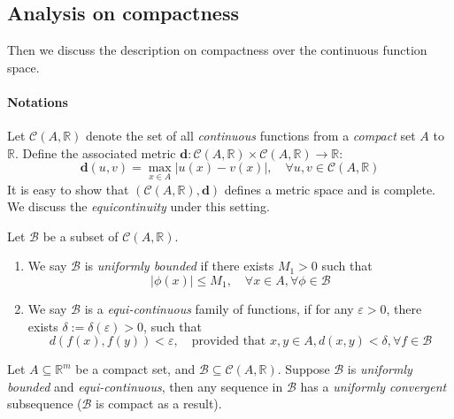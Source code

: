 \subsection{Analysis on compactness}
Then we discuss the description on compactness over the continuous function space.
\paragraph{Notations}Let $\mathcal{C}(A,\mathbb{R})$ denote the set of all \emph{continuous} functions from a \emph{compact} set $A$ to $\mathbb{R}$. Define the associated metric $\bm d:\mathcal{C}(A,\mathbb{R})\times \mathcal{C}(A,\mathbb{R})\to\mathbb{R}$:
\[
\bm d(u,v)=\max_{x\in A}|u(x)-v(x)|,\quad
\forall u,v\in \mathcal{C}(A,\mathbb{R})
\]
It is easy to show that $(\mathcal{C}(A,\mathbb{R}),\bm d)$ defines a metric space and is complete. We discuss the \emph{equicontinuity} under this setting.

\begin{definition}
Let $\mathcal{B}$ be a subset of $\mathcal{C}(A,\mathbb{R})$.
\begin{enumerate}
\item
We say $\mathcal{B}$ is \emph{uniformly bounded} if there exists $M_1>0$ such that
\[
|\phi(x)|\le M_1,\quad \forall x\in A,\forall \phi\in\mathcal{B}
\]
\item
We say $\mathcal{B}$ is a \emph{equi-continuous} family of functions, if for any $\varepsilon>0$, there exists $\delta:=\delta(\varepsilon)>0$, such that
\[
d(f(x),f(y))<\varepsilon,\quad
\mbox{provided that }x,y\in A,d(x,y)<\delta,\forall f\in\mathcal{B}
\]
\end{enumerate}
\end{definition}
\begin{theorem}
Let $A\subseteq\mathbb{R}^m$ be a compact set, and $\mathcal{B}\subseteq\mathcal{C}(A,\mathbb{R})$. Suppose $\mathcal{B}$ is \emph{uniformly bounded} and \emph{equi-continuous}, then any sequence in $\mathcal{B}$ has a \emph{uniformly convergent} subsequence ($\mathcal{B}$ is compact as a result). 
\end{theorem}

















